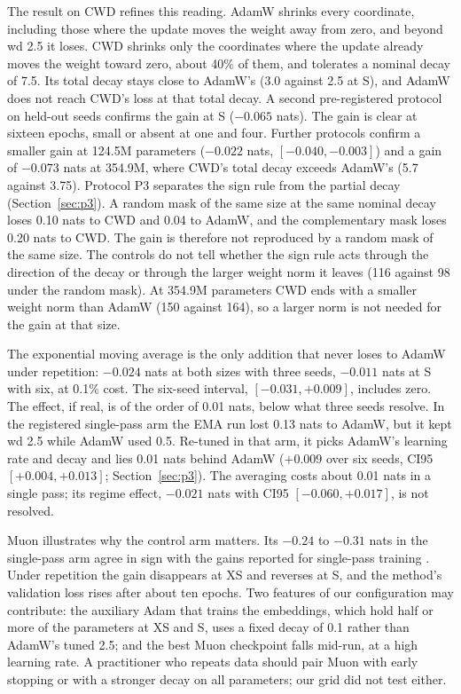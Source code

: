 \documentclass[twoside,11pt]{article}
\begin{document}
The result on CWD refines this reading. AdamW shrinks every coordinate, including those where the update moves the weight away from zero, and beyond wd 2.5 it loses. CWD shrinks only the coordinates where the update already moves the weight toward zero, about 40\% of them, and tolerates a nominal decay of 7.5. Its total decay stays close to AdamW's (3.0 against 2.5 at S), and AdamW does not reach CWD's loss at that total decay. A second pre-registered protocol on held-out seeds confirms the gain at S ($-0.065$ nats). The gain is clear at sixteen epochs, small or absent at one and four. Further protocols confirm a smaller gain at 124.5M parameters ($-0.022$ nats, $[-0.040, -0.003]$) and a gain of $-0.073$ nats at 354.9M, where CWD's total decay exceeds AdamW's (5.7 against 3.75). Protocol P3 separates the sign rule from the partial decay (Section~\ref{sec:p3}). A random mask of the same size at the same nominal decay loses 0.10 nats to CWD and 0.04 to AdamW, and the complementary mask loses 0.20 nats to CWD. The gain is therefore not reproduced by a random mask of the same size. The controls do not tell whether the sign rule acts through the direction of the decay or through the larger weight norm it leaves (116 against 98 under the random mask). At 354.9M parameters CWD ends with a smaller weight norm than AdamW (150 against 164), so a larger norm is not needed for the gain at that size.

The exponential moving average is the only addition that never loses to AdamW under repetition: $-0.024$ nats at both sizes with three seeds, $-0.011$ nats at S with six, at 0.1\% cost. The six-seed interval, $[-0.031, +0.009]$, includes zero. The effect, if real, is of the order of 0.01 nats, below what three seeds resolve. In the registered single-pass arm the EMA run lost 0.13 nats to AdamW, but it kept wd 2.5 while AdamW used 0.5. Re-tuned in that arm, it picks AdamW's learning rate and decay and lies 0.01 nats behind AdamW ($+0.009$ over six seeds, CI95 $[+0.004, +0.013]$; Section~\ref{sec:p3}). The averaging costs about 0.01 nats in a single pass; its regime effect, $-0.021$ nats with CI95 $[-0.060, +0.017]$, is not resolved.

Muon illustrates why the control arm matters. Its $-0.24$ to $-0.31$ nats in the single-pass arm agree in sign with the gains reported for single-pass training \citep{jordan2024muon,liu2025muon}. Under repetition the gain disappears at XS and reverses at S, and the method's validation loss rises after about ten epochs. Two features of our configuration may contribute: the auxiliary Adam that trains the embeddings, which hold half or more of the parameters at XS and S, uses a fixed decay of 0.1 rather than AdamW's tuned 2.5; and the best Muon checkpoint falls mid-run, at a high learning rate. A practitioner who repeats data should pair Muon with early stopping or with a stronger decay on all parameters; our grid did not test either.
\end{document}
